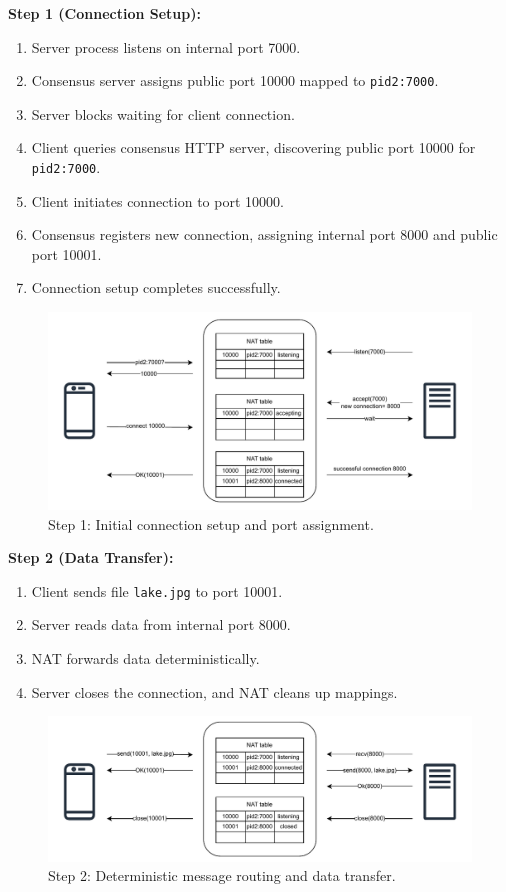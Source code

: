 \documentclass[10pt, 
]{IEEEtran}
\begin{document}
\textbf{Step 1 (Connection Setup):}
\begin{enumerate}
\item Server process listens on internal port 7000.
\item Consensus server assigns public port 10000 mapped to \texttt{pid2:7000}.
\item Server blocks waiting for client connection.
\item Client queries consensus HTTP server, discovering public port 10000 for \texttt{pid2:7000}.
\item Client initiates connection to port 10000.
\item Consensus registers new connection, assigning internal port 8000 and public port 10001.
\item Connection setup completes successfully.
\end{enumerate}

\begin{figure}[h]
\centering
\includegraphics[width=0.9\linewidth]{consensus_diagram_1.pdf}
\caption{Step 1: Initial connection setup and port assignment.}
\label{fig:consensus-1}
\end{figure}

\textbf{Step 2 (Data Transfer):}
\begin{enumerate}
\item Client sends file \texttt{lake.jpg} to port 10001.
\item Server reads data from internal port 8000.
\item NAT forwards data deterministically.
\item Server closes the connection, and NAT cleans up mappings.
\end{enumerate}

\begin{figure}[h]
\centering
\includegraphics[width=0.9\linewidth]{consensus_diagram_2.pdf}
\caption{Step 2: Deterministic message routing and data transfer.}
\label{fig:consensus-2}
\end{figure}
\end{document}
